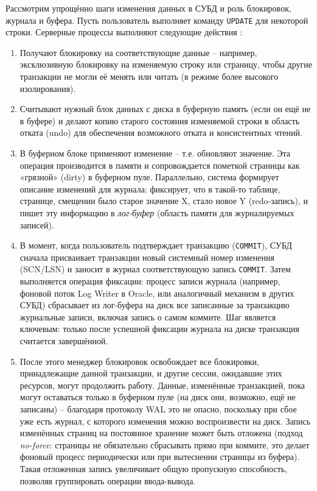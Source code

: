  Рассмотрим упрощённо шаги изменения данных в СУБД и роль блокировок, журнала и буфера. Пусть пользователь выполняет команду \texttt{UPDATE} для некоторой строки. Серверные процессы выполняют следующие действия \autocite{oracleessentialsc7}: 
 \begin{enumerate}
    \item Получают блокировку на соответствующие данные – например, эксклюзивную блокировку на изменяемую строку или страницу, чтобы другие транзакции не могли её менять или читать (в режиме более высокого изолирования). 
    \item Считывают нужный блок данных с диска в буферную память (если он ещё не в буфере) и делают копию старого состояния изменяемой строки в область отката (undo) для обеспечения возможного отката и консистентных чтений. 
    \item В буферном блоке применяют изменение – т.е. обновляют значение. Эта операция производится в памяти и сопровождается пометкой страницы как «грязной» (dirty) в буферном пуле. Параллельно, система формирует описание изменений для журнала: фиксирует, что в такой-то таблице, странице, смещении было старое значение X, стало новое Y (redo-запись), и пишет эту информацию в \textit{лог-буфер} (область памяти для журналируемых записей). 
    \item В момент, когда пользователь подтверждает транзакцию (\texttt{COMMIT}), СУБД сначала присваивает транзакции новый системный номер изменения (SCN/LSN) и заносит в журнал соответствующую запись \texttt{COMMIT}. Затем выполняется операция фиксации: процесс записи журнала (например, фоновой поток Log Writer в Oracle, или аналогичный механизм в других СУБД) сбрасывает из лог-буфера на диск все записанные за транзакцию журнальные записи, включая запись о самом коммите. Шаг является ключевым: только после успешной фиксации журнала на диске транзакция считается завершённой.
    \item После этого менеджер блокировок освобождает все блокировки, принадлежащие данной транзакции, и другие сессии, ожидавшие этих ресурсов, могут продолжить работу. Данные, изменённые транзакцией, пока могут оставаться только в буферном пуле (на диск они, возможно, ещё не записаны) – благодаря протоколу WAL это не опасно, поскольку при сбое уже есть журнал, с которого изменения можно воспроизвести на диск. Запись изменённых страниц на постоянное хранение может быть отложена (подход \textit{no-force}: страницы не обязательно сбрасывать прямо при коммите, это делает фоновый процесс периодически или при вытеснении страницы из буфера). Такая отложенная запись увеличивает общую пропускную способность, позволяя группировать операции ввода-вывода. 
 \end{enumerate}

